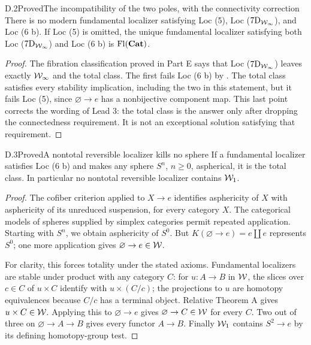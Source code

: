 \begin{claim}{D.2}{Proved}{The incompatibility of the two poles, with the connectivity correction}
There is no modern fundamental localizer satisfying Loc (5), Loc ($7\mathrm D_{\mathcal{W}_{\infty}}$), and Loc (6 b). If Loc (5) is omitted, the unique fundamental localizer satisfying both Loc ($7\mathrm D_{\mathcal{W}_{\infty}}$) and Loc (6 b) is $\operatorname{Fl}(\mathbf{Cat})$.
\end{claim}
\begin{proof}
The fibration classification proved in Part E says that Loc ($7\mathrm D_{\mathcal{W}_{\infty}}$) leaves exactly $\mathcal{W}_{\infty}$ and the total class. The first fails Loc (6 b) by . The total class satisfies every stability implication, including the two in this statement, but it fails Loc (5), since $\varnothing\to e$ has a nonbijective component map. This last point corrects the wording of Lead 3: the total class is the answer only after dropping the connectedness requirement. It is not an exceptional solution satisfying that requirement.
\end{proof}

\begin{claim}{D.3}{Proved}{A nontotal reversible localizer kills no sphere}
If a fundamental localizer satisfies Loc (6 b) and makes any sphere $S^n$, $n\geq0$, aspherical, it is the total class. In particular no nontotal reversible localizer contains $\mathcal{W}_1$.
\end{claim}
\begin{proof}
The cofiber criterion applied to $X\to e$ identifies asphericity of $X$ with asphericity of its unreduced suspension, for every category $X$. The categorical models of spheres supplied by simplex categories permit repeated application. Starting with $S^n$, we obtain asphericity of $S^0$. But $K(\varnothing\to e)=e\amalg e$ represents $S^0$; one more application gives $\varnothing\to e\in\mathcal{W}$.

For clarity, this forces totality under the stated axioms. Fundamental localizers are stable under product with any category $C$: for $u:A\to B$ in $\mathcal{W}$, the slices over $c\in C$ of $u\times C$ identify with $u\times(C/c)$; the projections to $u$ are homotopy equivalences because $C/c$ has a terminal object. Relative Theorem A gives $u\times C\in\mathcal{W}$. Applying this to $\varnothing\to e$ gives $\varnothing\to C\in\mathcal{W}$ for every $C$. Two out of three on $\varnothing\to A\to B$ gives every functor $A\to B$. Finally $\mathcal{W}_1$ contains $S^2\to e$ by its defining homotopy-group test.
\end{proof}


